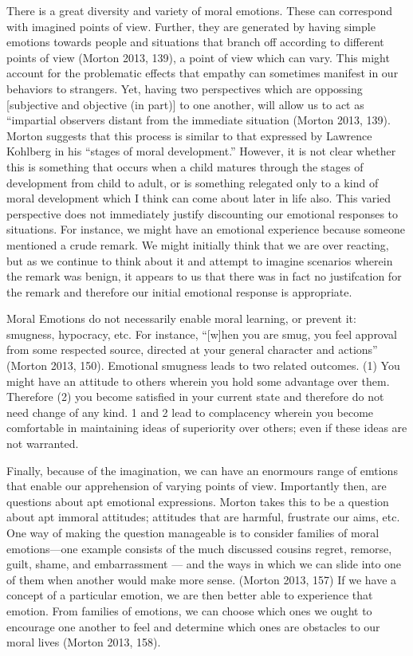 \documentclass[12pt]{book}
\theoremstyle{definition}
\theoremstyle{remark}
\begin{document}
There is a great diversity and variety of moral emotions. These can correspond with imagined points of view. Further, they are generated by having simple emotions towards people and situations that branch off according to different points of view (Morton 2013, 139), a point of view which can vary. This might account for the problematic effects that empathy can sometimes manifest in our behaviors to strangers. Yet, having two perspectives which are oppossing {[}subjective and objective (in part){]} to one another, will allow us to act as ``impartial observers distant from the immediate situation (Morton 2013, 139). Morton suggests that this process is similar to that expressed by Lawrence Kohlberg in his ``stages of moral development.'' However, it is not clear whether this is something that occurs when a child matures through the stages of development from child to adult, or is something relegated only to a kind of moral development which I think can come about later in life also. This varied perspective does not immediately justify discounting our emotional responses to situations. For instance, we might have an emotional experience because someone mentioned a crude remark. We might initially think that we are over reacting, but as we continue to think about it and attempt to imagine scenarios wherein the remark was benign, it appears to us that there was in fact no justifcation for the remark and therefore our initial emotional response is appropriate.

Moral Emotions do not necessarily enable moral learning, or prevent it: smugness, hypocracy, etc. For instance, ``{[}w{]}hen you are smug, you feel approval from some respected source, directed at your general character and actions'' (Morton 2013, 150). Emotional smugness leads to two related outcomes. (1) You might have an attitude to others wherein you hold some advantage over them. Therefore (2) you become satisfied in your current state and therefore do not need change of any kind. 1 and 2 lead to complacency wherein you become comfortable in maintaining ideas of superiority over others; even if these ideas are not warranted.

Finally, because of the imagination, we can have an enormours range of emtions that enable our apprehension of varying points of view. Importantly then, are questions about apt emotional expressions. Morton takes this to be a question about apt immoral attitudes; attitudes that are harmful, frustrate our aims, etc. One way of making
the question manageable is to consider families of moral emotions---one example consists of the much discussed cousins regret, remorse, guilt, shame, and embarrassment --- and the ways in which we can slide into one of them when another would make more sense. (Morton 2013, 157) If we have a concept of a particular emotion, we are then better able to experience that emotion. From families of emotions, we can choose which ones we ought to encourage one another to feel and determine which ones are obstacles to our moral lives (Morton 2013, 158).
\end{document}
